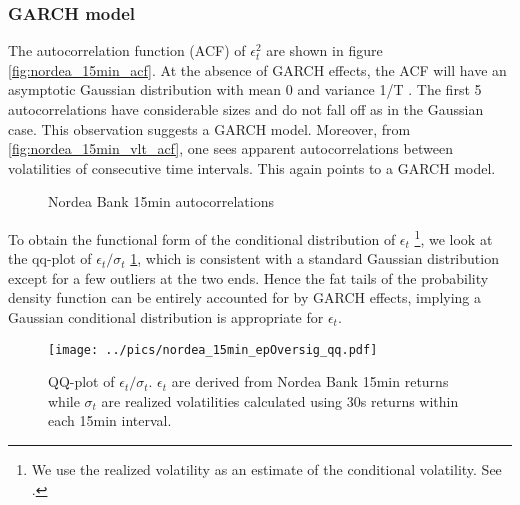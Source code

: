 \documentclass{book}
\begin{document}
\subsubsection{GARCH model}
The autocorrelation function (ACF) of $\epsilon_t^2$ are shown in figure
\ref{fig:nordea_15min_acf}. At the absence of GARCH effects, the ACF
will have an asymptotic Gaussian distribution with mean 0 and variance
1/T \cite{Bollerslev86, Bollerslev87}. The first 5 autocorrelations
have considerable sizes and do not fall off as in the Gaussian
case. This observation suggests a GARCH model. Moreover, from
\ref{fig:nordea_15min_vlt_acf}, one sees apparent autocorrelations
between volatilities of consecutive time intervals. This again points
to a GARCH model.
\begin{figure}[htb!]
  \centering
  \caption{Nordea Bank 15min autocorrelations}
\end{figure}

To obtain the functional form of the conditional distribution of
$\epsilon_t$ \footnote{We use the realized volatility as an estimate of the
conditional volatility. See \cite{Andersen03}.}, we look at the
qq-plot of $\epsilon_t/\sigma_t$ \ref{fig:nordea_15min_epOversig_qq},
which is consistent with a standard Gaussian distribution except for a
few outliers at the two ends. Hence the fat tails of the probability
density function can be entirely accounted for by GARCH effects,
implying a Gaussian conditional distribution is appropriate for $\epsilon_t$.
\begin{figure}[htb!]
  \centering
    \texttt{[image: ../pics/nordea\_15min\_epOversig\_qq.pdf]}
  \caption{QQ-plot of $\epsilon_t / \sigma_t$. $\epsilon_t$ are
    derived from Nordea Bank 15min returns while $\sigma_t$ are realized
    volatilities calculated using 30s returns within each 15min
    interval.}
  \label{fig:nordea_15min_epOversig_qq}
\end{figure}
\end{document}
